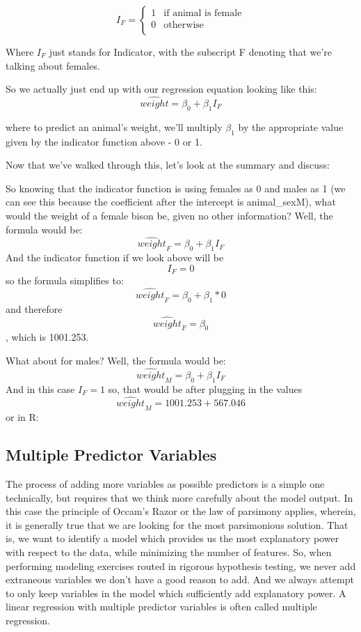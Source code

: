 \documentclass[
]{article}
\begin{document}
\[I_F = 
\begin{cases}
1 & \text{if animal is female}\\
0 & \text{otherwise}\\
\end{cases}
\]

Where \(I_F\) just stands for Indicator, with the subscript F denoting
that we're talking about females.

So we actually just end up with our regression equation looking like
this: \[\widehat{weight} = \beta_0 + \beta_1 I_F\]

where to predict an animal's weight, we'll multiply \(\beta_1\) by the
appropriate value given by the indicator function above - 0 or 1.

Now that we've walked through this, let's look at the summary and
discuss:

So knowing that the indicator function is using females as 0 and males
as 1 (we can see this because the coefficient after the intercept is
animal\_sexM), what would the weight of a female bison be, given no
other information? Well, the formula would be:
\[\widehat{weight}_F = \beta_0 + \beta_1 I_F\] And the indicator
function if we look above will be \[I_F = 0\] so the formula simplifies
to: \[\widehat{weight}_F = \beta_0 + \beta_1 * 0\] and therefore
\[\widehat{weight}_F = \beta_0\], which is 1001.253.

What about for males? Well, the formula would be:
\[\widehat{weight}_M = \beta_0 + \beta_1 I_F\] And in this case
\(I_F = 1\) so, that would be after plugging in the values
\[\widehat{weight}_M  = 1001.253 + 567.046\] or in R:

\hypertarget{multiple-predictor-variables}{%
\subsection{Multiple Predictor
Variables}\label{multiple-predictor-variables}}

The process of adding more variables as possible predictors is a simple
one technically, but requires that we think more carefully about the
model output. In this case the principle of Occam's Razor or the law of
parsimony applies, wherein, it is generally true that we are looking for
the most parsimonious solution. That is, we want to identify a model
which provides us the most explanatory power with respect to the data,
while minimizing the number of features. So, when performing modeling
exercises routed in rigorous hypothesis testing, we never add extraneous
variables we don't have a good reason to add. And we always attempt to
only keep variables in the model which sufficiently add explanatory
power. A linear regression with multiple predictor variables is often
called multiple regression.
\end{document}
